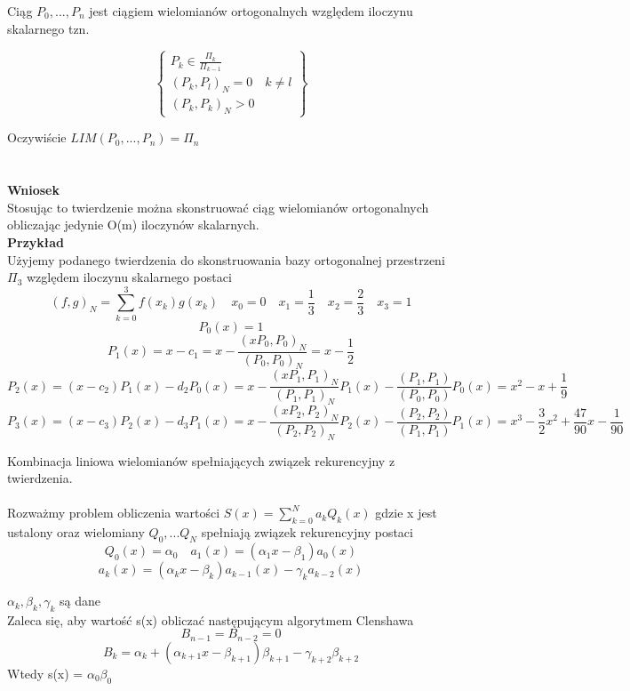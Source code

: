 \documentclass[polish]{kbk}
\begin{document}
  Ciąg  \( P_0, ..., P_n \) jest ciągiem wielomianów ortogonalnych względem iloczynu skalarnego tzn. 
  
          \[
	\left\{\begin{array}{lr}
	 P_k \in \frac{ \Pi_k}{ \Pi_{k-1} }  \\
	 (P_k, P_l)_N = 0 \quad k \neq l \\
	 (P_k, P_k)_N > 0  
        \end{array}\right\} 
  \]
  
  Oczywiście \( LIM ( P_0, ..., P_n ) = \Pi_n \)
  \\\\\\
    \textbf{Wniosek} \\
    Stosując to twierdzenie można skonstruować ciąg wielomianów ortogonalnych obliczając jedynie O(m) iloczynów skalarnych.\\
    
\textbf{Przykład} \\
Użyjemy podanego twierdzenia do skonstruowania bazy ortogonalnej przestrzeni \( \Pi_3 \) względem iloczynu skalarnego postaci
$$ (f,g)_N = \sum_{k=0}^3 f(x_k)g(x_k) \quad x_0 = 0 \quad x_1 = \frac{1}{3} \quad x_2 = \frac{2}{3} \quad x_3 = 1 $$
$$ P_0(x) = 1 $$
$$ P_1(x) = x - c_1 = x - \frac{ (xP_0, P_0)_N } { (P_0, P_0 )_N} = x - \frac{1}{2} $$
$$ P_2(x) = (x-c_2)P_1(x) - d_2P_0(x) = x - \frac{ (xP_1, P_1)_N } { (P_1, P_1 )_N} P_1(x) - \frac{ (P_1, P_1 ) } { (P_0, P_0 ) } P_0(x) = x^2 - x + \frac{1}{9}$$ 
$$ P_3(x) = (x-c_3)P_2(x) - d_3P_1(x) = x - \frac{ (xP_2, P_2)_N } { (P_2, P_2 )_N} P_2(x) - \frac{ (P_2, P_2 ) } { (P_1, P_1 ) } P_1(x) = x^3 - \frac{3}{2}x^2 + \frac{47}{90}x - \frac{1}{90}$$

Kombinacja liniowa wielomianów spełniających związek rekurencyjny z twierdzenia.
\\\\
Rozważmy problem obliczenia wartości \( S(x) = \sum_{k=0}^N a_k Q_k(x) \) gdzie x jest ustalony oraz wielomiany \(Q_0, ... Q_N\) spełniają związek rekurencyjny postaci 
$$ Q_0(x) = \alpha_0 \quad a_1(x) = (\alpha_1x - \beta_1)a_0(x) $$
$$ a_k(x) = (\alpha_kx-\beta_k) a_{k-1}(x) - \gamma_k a_{k-2}(x) $$

\( \alpha_k, \beta_k, \gamma_k \) są dane\\


Zaleca się, aby wartość s(x) obliczać następującym algorytmem Clenshawa ~\cite{znaczek}
$$B_{n-1} = B_{n-2} = 0 $$
$$ B_k = \alpha_k + (\alpha_{k+1}x - \beta_{k+1})\beta_{k+1} - \gamma_{k+2}\beta_{k+2} $$
Wtedy s(x) = \( \alpha_0 \beta_0 \) \\
\end{document}
